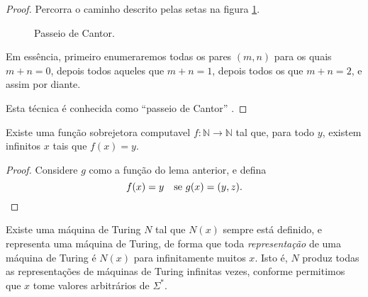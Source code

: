 \begin{proof}
    Percorra o caminho descrito pelas setas na figura
    \ref{passeio_cantor}.

    \begin{figure}[h]
        \centering
        \caption{Passeio de Cantor.}
        \label{passeio_cantor}
    \end{figure}

    Em essência, primeiro enumeraremos todas os pares $(m, n)$
    para os quais $m + n = 0$,
    depois todos aqueles que $m + n = 1$,
    depois todos os que $m + n = 2$,
    e assim por diante.

    Esta técnica é conhecida como ``passeio de Cantor''
    \cite[p. 6]{CarnielliConiglioBianconi2006}.
\end{proof}

\begin{lemma}
    Existe uma função sobrejetora computavel
    $f: \mathbb N \rightarrow \mathbb N$
    tal que,
    para todo $y$,
    existem infinitos $x$ tais que $f(x) = y$.
\end{lemma}
\begin{proof}
    Considere $g$ como a função do lema anterior,
    e defina
    \begin{equation*}
        f(x) = y \quad \text{se $g(x) = (y, z)$.} \qedhere
    \end{equation*}
\end{proof}

\begin{lemma}
    Existe uma máquina de Turing $N$
    tal que $N(x)$ sempre está definido,
    e representa uma máquina de Turing,
    de forma que toda \emph{representação}
    de uma máquina de Turing
    é $N(x)$ para infinitamente muitos $x$.
    Isto é, $N$ produz todas as representações de máquinas de Turing
    infinitas vezes,
    conforme permitimos que $x$ tome valores arbitrários de $\Sigma^*$.
\end{lemma}

